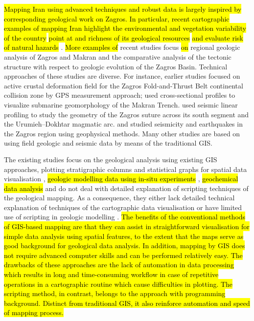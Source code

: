 \documentclass[12pt,a4paper,oneside]{article}
\def \newpar{\vspace{6pt}}
\begin{document}
\newpar \hl{Mapping Iran using advanced techniques and robust data is largely inspired by corresponding geological work on Zagros. In particular, recent cartographic examples of mapping Iran highlight the environmental and vegetation variability of the country} \citep{ESKANDARI2022101727,TOOSI2022101733} \hl{point at and richness of its geological resources} \citep{GARAJEH2022473} \hl{and evaluate risk of natural hazards} \citep{MOSTAFAMOUSAVI2022128072,MAFIGHOLAMI2022131841}. \hl{More examples of }recent studies focus \hl{on }regional geologic analysis of Zagros and Makran and the comparative analysis of the tectonic structure with respect to geologic evolution of the Zagros Basin. Technical approaches of these studies are diverse. For instance, earlier studies \citep{Palano,Bayer,Masson} focused on active crustal deformation field for the Zagros Fold-and-Thrust Belt continental collision zone by GPS measurement approach; \cite{Lemenkova2020a} used cross-sectional profiles to visualize submarine geomorphology of the Makran Trench. \cite{Motaghi} used seismic linear profiling to study the geometry of the Zagros suture across its south segment and the Urumieh–Dokhtar magmatic arc. \cite{Adams} and \cite{Massonetal2005} studied seismicity and earthquakes in the Zagros region using geophysical methods. Many other studies are based on using field geologic and seismic data by means of the traditional GIS.

\newpar The existing studies focus on the geological analysis using existing GIS approaches, plotting stratigraphic columns and statistical graphs for spatial data visualisation \citep{Mouthereau,Koshnaw}, \hl{geologic modelling data using in-situ experiments} \cite{HEIDARI2021104561,SOLEIMANI2016138,Lindh202222,HOSSEINI2021104452}, \hl{geochemical data analysis} \cite{MOKHTARI2021125774,AFZAL2017278,Lindh202208} and do not deal with detailed explanation of scripting techniques of the geological mapping. As a consequence, they either lack detailed technical explanation of techniques of the cartographic data visualisation \citep{Tavani} or have limited use of scripting in geologic modelling \citep{Lemenkov2021}. \hl{The benefits of the conventional methods of GIS-based mapping are that they can assist in straightforward visualisation for simple data analysis using spatial features, to the extent that the maps serve as good background for geological data analysis. In addition, mapping by GIS does not require advanced computer skills and can be performed relatively easy. The drawbacks of these approaches are the lack of automation in data processing which results in long and time-consuming workflow in case of repetitive operations in a cartographic routine which cause difficulties in plotting. The scripting method, in contrast, belongs to the approach with programming background. Distinct from traditional GIS, it also reinforce automation and speed of mapping process.}
\end{document}
